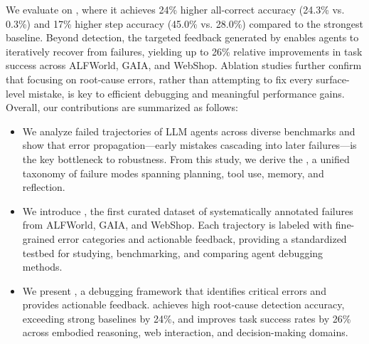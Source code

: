 We evaluate \ModelName{} on \Bench{}, where it achieves 24\% higher all-correct accuracy (24.3\% vs. 0.3\%) and 17\% higher step accuracy (45.0\% vs. 28.0\%) compared to the strongest baseline. Beyond detection, the targeted feedback generated by \ModelName{} enables agents to iteratively recover from failures, yielding up to 26\% relative improvements in task success across ALFWorld, GAIA, and WebShop. Ablation studies further confirm that focusing on root-cause errors, rather than attempting to fix every surface-level mistake, is key to efficient debugging and meaningful performance gains.
Overall, our contributions are summarized as follows:
\begin{itemize}[leftmargin=1.2em, itemsep=0.1em, topsep=0.25em]
    \item We analyze failed trajectories of LLM agents across diverse benchmarks and show that error propagation—early mistakes cascading into later failures—is the key bottleneck to robustness. From this study, we derive the \AET{}, a unified taxonomy of failure modes spanning planning, tool use, memory, and reflection.
    \item We introduce \Bench{}, the first curated dataset of systematically annotated failures from ALFWorld, GAIA, and WebShop. Each trajectory is labeled with fine-grained error categories and actionable feedback, providing a standardized testbed for studying, benchmarking, and comparing agent debugging methods.
    \item We present \ModelName{}, a debugging framework that identifies critical errors and provides actionable feedback. \ModelName{} achieves high root-cause detection accuracy, exceeding strong baselines by 24\%, and improves task success rates by 26\% across embodied reasoning, web interaction, and decision-making domains.
\end{itemize}
